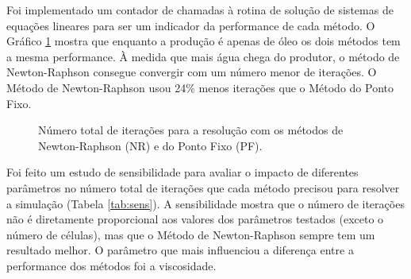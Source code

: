 \documentclass[final,5p]{elsarticle}
\numberwithin{equation}{section}
\begin{document}
        Foi implementado um contador de chamadas à rotina de solução de sistemas de equações lineares para ser um indicador da performance de cada método. O Gráfico \ref{fig:chamadasgauss} mostra que enquanto a produção é apenas de óleo os dois métodos tem a mesma performance. À medida que mais água chega do produtor, o método de Newton-Raphson consegue convergir com um número menor de iterações. O Método de Newton-Raphson usou 24\% menos iterações que o Método do Ponto Fixo.

        \begin{figure}[hbt!]
            \caption{Número total de iterações para a resolução com os métodos de Newton-Raphson (NR) e do Ponto Fixo (PF).}
            \label{fig:chamadasgauss}
        \end{figure}

        Foi feito um estudo de sensibilidade para avaliar o impacto de diferentes parâmetros no número total de iterações que cada método precisou para resolver a simulação (Tabela \ref{tab:sens}). A sensibilidade mostra que o número de iterações não é diretamente proporcional aos valores dos parâmetros testados (exceto o número de células), mas que o Método de Newton-Raphson sempre tem um resultado melhor. O parâmetro que mais influenciou a diferença entre a performance dos métodos foi a viscosidade.
\end{document}
